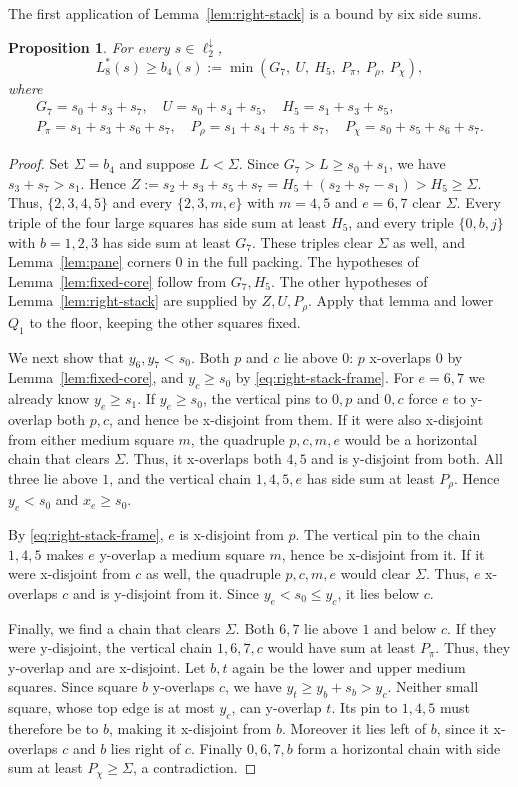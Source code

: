 \documentclass[12pt]{amsart}
\newtheorem{proposition}[theorem]{Proposition}
\theoremstyle{definition}
\theoremstyle{remark}
\numberwithin{equation}{section}
\numberwithin{figure}{section}
\numberwithin{table}{section}
\newcommand{\Ppi}{P_\pi}
\newcommand{\Prho}{P_\rho}
\newcommand{\Pchi}{P_\chi}
\begin{document}
The first application of Lemma~\ref{lem:right-stack} is a bound by six
side sums.
\begin{proposition}\label{prop:ell5}
For every $s\in\ell_2^\downarrow$,
\[
L_8^*(s)\ge b_4(s):=\min(G_7,\ U,\ H_5,\ \Ppi,\ \Prho,\ \Pchi),
\]
where
\begin{gather*}
G_7=s_0+s_3+s_7,\quad U=s_0+s_4+s_5,\quad H_5=s_1+s_3+s_5,\\
\Ppi=s_1+s_3+s_6+s_7,\quad \Prho=s_1+s_4+s_5+s_7,\quad
\Pchi=s_0+s_5+s_6+s_7.
\end{gather*}
\end{proposition}
\begin{proof}
Set $\Sigma=b_4$ and suppose $L<\Sigma$. Since $G_7>L\ge s_0+s_1$, we have
$s_3+s_7>s_1$. Hence
$Z:=s_2+s_3+s_5+s_7=H_5+(s_2+s_7-s_1)>H_5\ge\Sigma$.
Thus, $\{2,3,4,5\}$ and every $\{2,3,m,e\}$ with $m=4,5$ and $e=6,7$
clear $\Sigma$. Every triple of the four large squares has side sum at least
$H_5$, and every triple $\{0,b,j\}$ with $b=1,2,3$ has side sum at least
$G_7$. These triples clear $\Sigma$ as well, and Lemma~\ref{lem:pane}
corners $0$ in the full packing. The hypotheses of Lemma~\ref{lem:fixed-core}
follow from $G_7,H_5$. The other hypotheses of
Lemma~\ref{lem:right-stack} are supplied by $Z,U,\Prho$. Apply that lemma
and lower $Q_1$ to the floor, keeping the other squares fixed.

We next show that $y_6,y_7<s_0$.
Both $p$ and $c$ lie above $0$: $p$ x-overlaps $0$ by
Lemma~\ref{lem:fixed-core}, and $y_c\ge s_0$ by
\eqref{eq:right-stack-frame}.
For $e=6,7$ we already know $y_e\ge s_1$. If $y_e\ge s_0$, the vertical
pins to $0,p$ and $0,c$ force $e$ to y-overlap both $p,c$, and
hence be x-disjoint from them. If it were also x-disjoint from either
medium square $m$, the quadruple $p,c,m,e$ would be a horizontal chain that clears $\Sigma$.
Thus, it x-overlaps both $4,5$ and is y-disjoint from both.
All three lie above $1$, and the vertical chain $1,4,5,e$ has side sum at
least $\Prho$. Hence $y_e<s_0$ and $x_e\ge s_0$.

By \eqref{eq:right-stack-frame}, $e$ is x-disjoint from $p$. The vertical
pin to the chain $1,4,5$ makes $e$ y-overlap a medium square $m$,
hence be x-disjoint from it. If it were x-disjoint from $c$ as well, the
quadruple $p,c,m,e$ would clear $\Sigma$. Thus, $e$ x-overlaps $c$
and is y-disjoint from it. Since $y_e<s_0\le y_c$, it lies below $c$.

Finally, we find a chain that clears $\Sigma$.
Both $6,7$ lie above $1$ and below $c$. If they were y-disjoint, the
vertical chain $1,6,7,c$ would have sum at least $\Ppi$. Thus, they
y-overlap and are x-disjoint. Let $b,t$ again be the lower and
upper medium squares. Since square $b$ y-overlaps $c$, we have $y_t\ge y_b+s_b>y_c$.
Neither small square, whose top edge is at most $y_c$, can y-overlap $t$. Its pin to $1,4,5$ must therefore be to $b$, making it
x-disjoint from $b$. Moreover it lies left of $b$, since it x-overlaps $c$ and $b$ lies right of $c$. Finally $0,6,7,b$ form a horizontal
chain with side sum at least $\Pchi\ge\Sigma$, a contradiction.
\end{proof}
\end{document}
